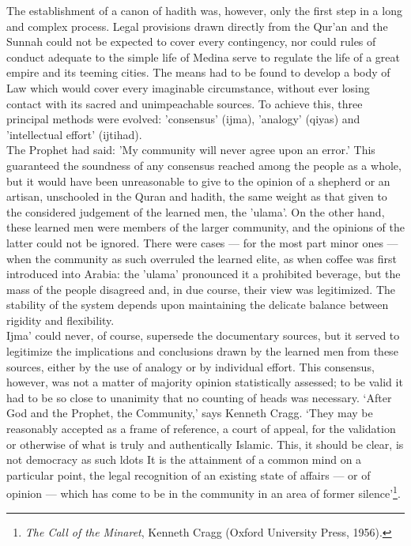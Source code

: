 \documentclass[10pt, twoside]{book}
\begin{document}
The establishment of a canon of hadith was, however, only the first step in a long and complex 
process. Legal provisions drawn directly from the Qur'an and the Sunnah could not be expected to 
cover every contingency, nor could rules of conduct adequate to the simple life of Medina serve to 
regulate the life of a great empire and its teeming cities. The means had to be found to develop a 
body of Law which would cover every imaginable circumstance, without ever losing contact with its 
sacred and unimpeachable sources. To achieve this, three principal methods were evolved: 'consensus' 
(ijma), 'analogy' (qiyas) and 'intellectual effort' (ijtihad). \\

The Prophet had said: 'My community will never agree upon an error.' This guaranteed the soundness of 
any consensus reached among the people as a whole, but it would have been unreasonable to give to the 
opinion of a shepherd or an artisan, unschooled in the Quran and hadith, the same weight as that 
given to the considered judgement of the learned men, the 'ulama'. On the other hand, these learned 
men were members of the larger community, and the opinions of the latter could not be ignored. There 
were cases --- for the most part minor ones --- when the community as such overruled the learned elite, 
as when coffee was first introduced into Arabia: the 'ulama' pronounced it a prohibited beverage, but 
the mass of the people disagreed and, in due course, their view was legitimized. The stability of the 
system depends upon maintaining the delicate balance between rigidity and flexibility. \\

Ijma' could never, of course, supersede the documentary sources, but it served to legitimize the 
implications and conclusions drawn by the learned men from these sources, either by the use of 
analogy or by individual effort. This consensus, however, was not a matter of majority opinion 
statistically assessed; to be valid it had to be so close to unanimity that no counting of heads was 
necessary. `After God and the Prophet, the Community,' says Kenneth Cragg. `They may be reasonably 
accepted as a frame of reference, a court of appeal, for the validation or otherwise of what is truly 
and authentically Islamic. This, it should be clear, is not democracy as such ldots{} It is the 
attainment of a common mind on a particular point, the legal recognition of an existing state of 
affairs --- or of opinion --- which has come to be in the community in an area of former silence'\footnote{\emph{The Call of the Minaret}, Kenneth Cragg (Oxford University Press, 1956).}. \\
\end{document}
